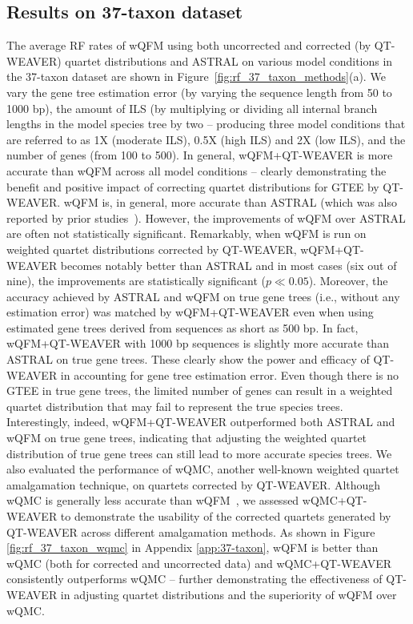 \documentclass[runningheads]{llncs}
\begin{document}
\subsection{Results on 37-taxon dataset}
The average RF rates of wQFM using both uncorrected and corrected (by QT-WEAVER) quartet distributions and ASTRAL on various model conditions in the 37-taxon dataset are shown in Figure~\ref{fig:rf_37_taxon_methods}(a). %
We vary the gene tree estimation error (by varying the sequence length from 50 to 1000 bp), the amount of ILS (by multiplying or dividing all internal branch lengths in the model species tree by two -- producing three model conditions that are referred to as 1X (moderate ILS), 0.5X (high ILS) and 2X (low ILS), and the number of genes (from 100 to 500). In general, wQFM+QT-WEAVER is more accurate than wQFM across all model conditions -- clearly demonstrating the benefit and positive impact of correcting quartet distributions for GTEE by QT-WEAVER. wQFM is, in general, more accurate than ASTRAL (which was also reported by prior studies~\cite{wqfm,mahbub2022qt}). However, the improvements of wQFM over ASTRAL are often not statistically significant. Remarkably, when wQFM is run on weighted quartet distributions corrected by QT-WEAVER, wQFM+QT-WEAVER becomes notably better than ASTRAL and in most cases (six out of nine), the improvements are statistically significant ($p \ll 0.05$). Moreover, the accuracy achieved by ASTRAL and wQFM on true gene trees (i.e., without any estimation error) was matched by wQFM+QT-WEAVER even when using estimated gene trees derived from sequences as short as 500 bp. In fact, wQFM+QT-WEAVER with 1000 bp sequences is slightly more accurate than ASTRAL on true gene trees. These clearly show the power and efficacy of QT-WEAVER in accounting for gene tree estimation error. %
Even though there is no GTEE in true gene trees, the limited number of genes can result in a weighted quartet distribution that may fail to represent the true species trees. 
Interestingly, indeed, wQFM+QT-WEAVER outperformed both ASTRAL and wQFM on true gene trees, indicating that adjusting the weighted quartet distribution of true gene trees can still lead to more accurate species trees. We also evaluated the performance of wQMC, another well-known weighted quartet amalgamation technique, on quartets corrected by QT-WEAVER. Although wQMC is generally less accurate than wQFM~\cite{wqfm,mahbub2022qt}, we assessed wQMC+QT-WEAVER to demonstrate the usability of the corrected quartets generated by QT-WEAVER across different amalgamation methods. %
As shown in Figure \ref{fig:rf_37_taxon_wqmc} in Appendix \ref{app:37-taxon}, wQFM is better than wQMC (both for corrected and uncorrected data) and wQMC+QT-WEAVER consistently outperforms wQMC -- further demonstrating the effectiveness of QT-WEAVER in adjusting quartet distributions and the superiority of wQFM over wQMC.
\end{document}
